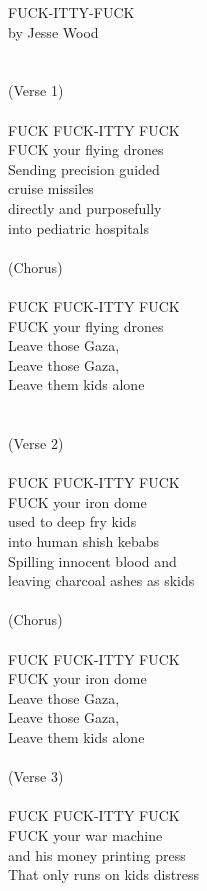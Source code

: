 \documentclass[16pt,openany,oneside]{book}
\begin{document}
FUCK-ITTY-FUCK \\
by Jesse Wood \\
\\\\
(Verse 1) 
\\\\
FUCK FUCK-ITTY FUCK \\
FUCK your flying drones \\
Sending precision guided \\ 
cruise missiles \\ 
directly and purposefully \\ 
into pediatric hospitals
\\\\
(Chorus)
\\\\
FUCK FUCK-ITTY FUCK \\
FUCK your flying drones \\
Leave those Gaza, \\ 
Leave those Gaza, \\
Leave them kids alone \\
\\\\
(Verse 2)
\\\\
FUCK FUCK-ITTY FUCK \\
FUCK your iron dome \\
used to deep fry kids \\ 
into human shish kebabs \\
Spilling innocent blood and \\
leaving charcoal ashes as skids
\\\\
(Chorus)
\\\\
FUCK FUCK-ITTY FUCK \\
FUCK your iron dome \\
Leave those Gaza, \\ 
Leave those Gaza, \\
Leave them kids alone
\\\\
(Verse 3)
\\\\
FUCK FUCK-ITTY FUCK \\
FUCK your war machine \\ 
and his money printing press \\
That only runs on kids distress
\\\\
\end{document}

